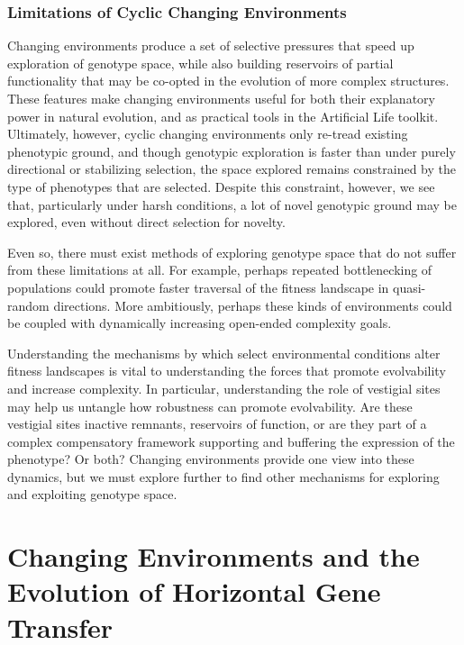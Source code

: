 \documentclass[PhD]{msu-thesis}
\begin{document}
\subsection{Limitations of Cyclic Changing Environments}
Changing environments produce a set of selective pressures that speed up exploration of genotype space, while also building reservoirs of partial functionality that may be co-opted in the evolution of more complex structures. These features make changing environments useful for both their explanatory power in natural evolution, and as practical tools in the Artificial Life toolkit.
Ultimately, however, cyclic changing environments only re-tread existing phenotypic ground, and though genotypic exploration is faster than under purely directional or stabilizing selection, the space explored remains constrained by the type of phenotypes that are selected. Despite this constraint, however, we see that, particularly under harsh conditions, a lot of novel genotypic ground may be explored, even without direct selection for novelty. 

Even so, there must exist methods of exploring genotype space that do not suffer from these limitations at all.
For example, perhaps repeated bottlenecking of populations could promote faster traversal of the fitness landscape in quasi-random directions. More ambitiously, perhaps these kinds of environments could be coupled with dynamically increasing open-ended complexity goals.

Understanding the mechanisms by which select environmental conditions alter fitness landscapes is vital to understanding the forces that promote evolvability and increase complexity. In particular, understanding the role of vestigial sites may help us untangle how robustness can promote evolvability. Are these vestigial sites inactive remnants, reservoirs of function, or are they part of a complex compensatory framework supporting and buffering the expression of the phenotype? Or both? Changing environments provide one view into these dynamics, but we must explore further to find other mechanisms for exploring and exploiting genotype space.


\chapter{Changing Environments and the Evolution of Horizontal Gene Transfer}
\end{document}
